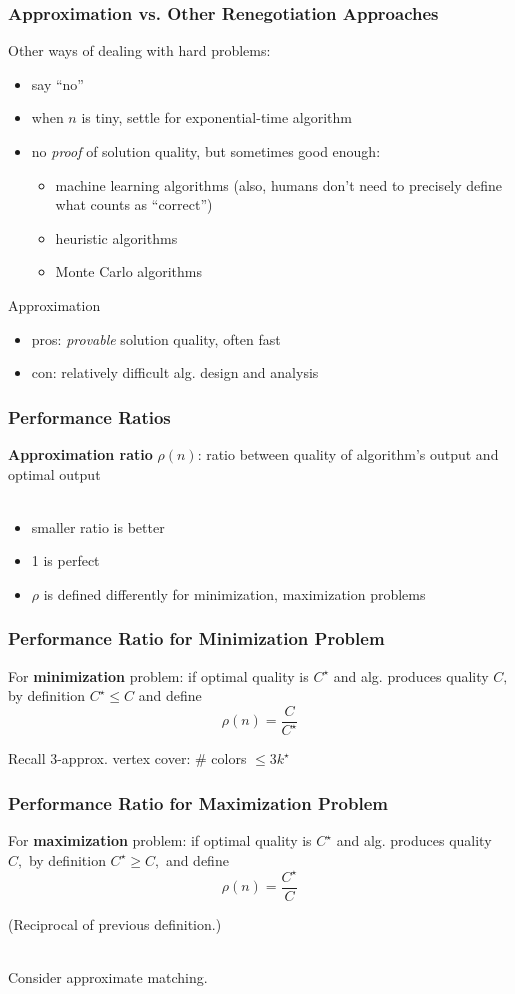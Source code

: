 \documentclass{beamer}
\newcommand{\stanza}{ \\~\ }
\begin{document}
\begin{frame} \frametitle{Approximation vs. Other Renegotiation Approaches}
Other ways of dealing with hard problems:
\begin{itemize}
  \item say ``no''
  \item when $n$ is tiny, settle for exponential-time algorithm
  \item no \emph{proof} of solution quality, but sometimes good enough:
    \begin{itemize}
      \item machine learning algorithms (also, humans don't need to precisely define what counts as ``correct'')
      \item heuristic algorithms
      \item Monte Carlo algorithms
    \end{itemize}
\end{itemize}

Approximation
\begin{itemize}
  \item pros: \emph{provable} solution quality, often fast
  \item con: relatively difficult alg. design and analysis
\end{itemize}
\end{frame}

\begin{frame} \frametitle{Performance Ratios}
\textbf{Approximation ratio} $\rho(n)$: ratio between quality of algorithm's output
and optimal output \stanza
\begin{itemize}
  \item smaller ratio is better
  \item 1 is perfect
  \item $\rho$ is defined differently for minimization, maximization problems
\end{itemize}
\end{frame}

\begin{frame} \frametitle{Performance Ratio for Minimization Problem}
  For \textbf{minimization} problem: if optimal quality is $C^\star$ and alg. produces
      quality $C,$ by definition $C^\star \leq C$ and define
      \[ \rho(n) = \frac{C}{C^\star} \]
  
  Recall 3-approx. vertex cover: \# colors $\leq 3 k^\star$
  \end{frame}
  
  \begin{frame} \frametitle{Performance Ratio for Maximization Problem}
For \textbf{maximization} problem: if optimal quality is $C^\star$ and alg. produces
    quality $C,$ by definition $C^\star \geq C,$ and define
    \[ \rho(n) = \frac{C^\star}{C} \]
  
    (Reciprocal of previous definition.)
    \stanza
    
    Consider approximate matching.

  \end{frame}
\end{document}
